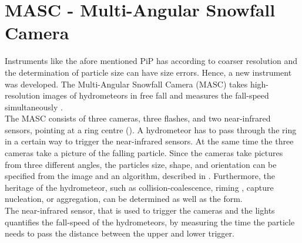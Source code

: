 \section{MASC - Multi-Angular Snowfall Camera}

Instruments like the afore mentioned PiP has according to \cite{garrett_fall_2012} coarser resolution and the determination of particle size can have size errors. Hence, a new instrument was developed. The Multi-Angular Snowfall Camera (MASC) takes high-resolution images of hydrometeors in free fall and measures the fall-speed simultaneously . \\
The MASC consists of three cameras, three flashes, and two near-infrared sensors, pointing at a ring centre (). A hydrometeor has to pass through the ring in a certain way to trigger the near-infrared sensors. At the same time the three cameras take a picture of the falling particle. Since the cameras take pictures from three different angles, the particles size, shape, and orientation can be specified from the image and an algorithm, described in \cite{garrett_fall_2012}. Furthermore, the heritage of the hydrometeor, such as collision-coalescence, riming , capture nucleation, or aggregation, can be determined as well as the form. \\
The near-infrared sensor, that is used to trigger the cameras and the lights quantifies the fall-speed of the hydrometeors, by measuring the time the particle needs to pass the distance between the upper and lower trigger.    




